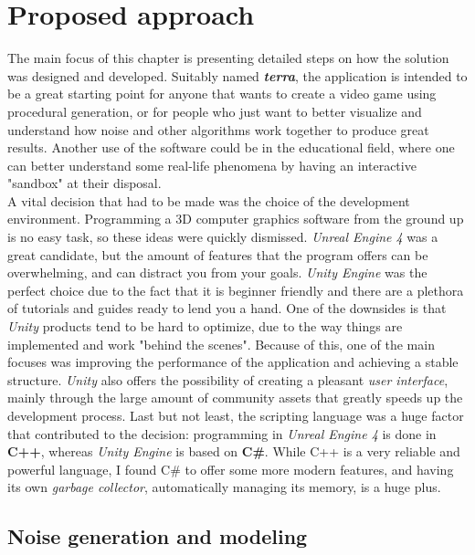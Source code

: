 \chapter{Proposed approach}

\pagestyle{fancy}

\label{proposedApproach}

The main focus of this chapter is presenting detailed steps on how the solution was designed and developed. Suitably named \textbf{\textit{terra}}, the application is intended to be a great starting point for anyone that wants to create a video game using procedural generation, or for people who just want to better visualize and understand how noise and other algorithms work together to produce great results. Another use of the software could be in the educational field, where one can better understand some real-life phenomena by having an interactive "sandbox" at their disposal.\\

A vital decision that had to be made was the choice of the development environment. Programming a 3D computer graphics software from the ground up is no easy task, so these ideas were quickly dismissed. \textit{Unreal Engine 4} was a great candidate, but the amount of features that the program offers can be overwhelming, and can distract you from your goals. \textit{Unity Engine} was the perfect choice due to the fact that it is beginner friendly and there are a plethora of tutorials and guides ready to lend you a hand. One of the downsides is that \textit{Unity} products tend to be hard to optimize, due to the way things are implemented and work "behind the scenes". Because of this, one of the main focuses was improving the performance of the application and achieving a stable structure. \textit{Unity} also offers the possibility of creating a pleasant \textit{user interface}, mainly through the large amount of community assets that greatly speeds up the development process. Last but not least, the scripting language was a huge factor that contributed to the decision: programming in \textit{Unreal Engine 4} is done in \textbf{C++}, whereas \textit{Unity Engine} is based on \textbf{C\#}. While C++ is a very reliable and powerful language, I found C\# to offer some more modern features, and having its own \textit{garbage collector}, automatically managing its memory, is a huge plus.

\section{Noise generation and modeling}

